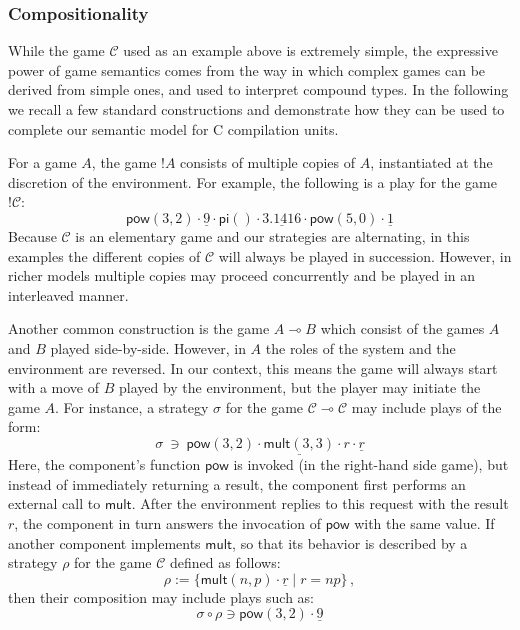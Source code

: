 \documentclass[acmsmall,timestamp,review,anonymous]{acmart}
\newcommand{\kw}[1]{\ensuremath{ \mathsf{#1} }}
\begin{document}

\subsubsection{Compositionality} \label{sec:mainideas:gs:comp} %

While the game $\mathcal{C}$ used as an example above
is extremely simple,
the expressive power of game semantics
comes from the way in which complex games can be derived from simple ones,
and used to interpret compound types.
In the following we recall a few standard constructions
and demonstrate how they can be used
to complete our semantic model for C compilation units.

For a game $A$,
the game $!A$ consists of multiple copies of $A$,
instantiated at the discretion of the environment.
For example,
the following is a play for the game $!\mathcal{C}$:
\[
    \kw{pow}(3,2) \cdot
    \underline{9} \cdot
    \kw{pi}() \cdot
    \underline{3.1416} \cdot
    \kw{pow}(5,0) \cdot
    \underline{1}
\]
Because $\mathcal{C}$ is an elementary game
and our strategies are alternating,
in this examples the different copies of $\mathcal{C}$
will always be played in succession.
However,
in richer models multiple copies may proceed
concurrently
and be played in an interleaved manner.

Another common construction is the game $A \multimap B$
which consist of the games $A$ and $B$ played side-by-side.
However, in $A$ the roles of the system and the environment
are reversed.
In our context,
this means the game will always start
with a move of $B$ played by the environment,
but the player may initiate the game $A$.
For instance, a strategy $\sigma$
for the game $\mathcal{C} \multimap \mathcal{C}$
may include plays of the form:
\[
    \sigma \: \ni \:
    \kw{pow}(3,2) \cdot
    \underline{\kw{mult}(3,3)} \cdot
    r \cdot
    \underline{r}
\]
Here,
the component's function $\kw{pow}$
is invoked (in the right-hand side game),
but instead of immediately returning a result,
the component first performs an external call to $\kw{mult}$.
After the environment replies to this request with the result $r$,
the component in turn answers the invocation of $\kw{pow}$
with the same value.
If another component implements $\kw{mult}$,
so that its behavior is described by a strategy $\rho$
for the game $\mathcal{C}$ defined as follows:
\[ \rho := \{ \kw{mult}(n,p) \cdot \underline{r} \mid r = n p \} \,, \]
then their composition may include plays such as:
\[ \sigma \circ \rho \ni \kw{pow}(3,2) \cdot \underline{9} \]
\end{document}
